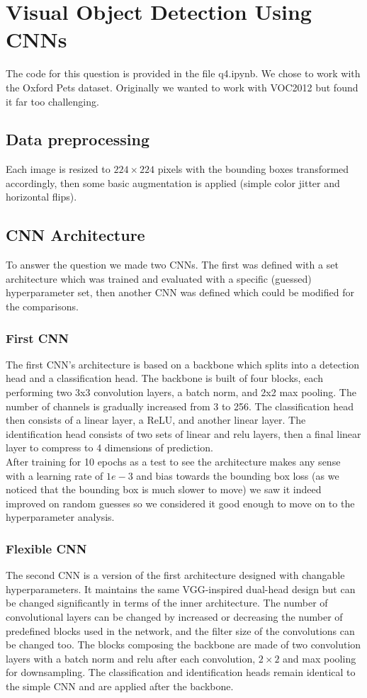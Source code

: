 \clearpage
\section{Visual Object Detection Using CNNs}
The code for this question is provided in the file q4.ipynb. We chose to work with the Oxford Pets dataset. Originally we wanted to work with VOC2012 but found it far too challenging.
\subsection{Data preprocessing}
Each image is resized to \(224 \times 224\) pixels with the bounding boxes transformed accordingly, then some basic augmentation is applied (simple color jitter and horizontal flips).
\subsection{CNN Architecture}
To answer the question we made two CNNs. The first was defined with a set architecture which was trained and evaluated with a specific (guessed) hyperparameter set, then another CNN was defined which could be modified for the comparisons.
\subsubsection{First CNN}
The first CNN's architecture is based on a backbone which splits into a detection head and a classification head. The backbone is built of four blocks, each performing two 3x3 convolution layers, a batch norm, and 2x2 max pooling. The number of channels is gradually increased from 3 to 256. The classification head then consists of a linear layer, a ReLU, and another linear layer. The identification head consists of two sets of linear and relu layers, then a final linear layer to compress to 4 dimensions of prediction. \bigskip \\ After training for 10 epochs as a test to see the architecture makes any sense with a learning rate of \(1e-3\) and bias towards the bounding box loss (as we noticed that the bounding box is much slower to move) we saw it indeed improved on random guesses so we considered it good enough to move on to the hyperparameter analysis.
\subsubsection{Flexible CNN}
The second CNN is a version of the first architecture designed with changable hyperparameters. It maintains the same VGG-inspired dual-head design but can be changed significantly in terms of the inner architecture. The number of convolutional layers can be changed by increased or decreasing the number of predefined blocks used in the network, and the filter size of the convolutions can be changed too. The blocks composing the backbone are made of two convolution layers with a batch norm and relu after each convolution, \(2 \times 2\) and max pooling for downsampling. The classification and identification heads remain identical to the simple CNN and are applied after the backbone.
\newpage
